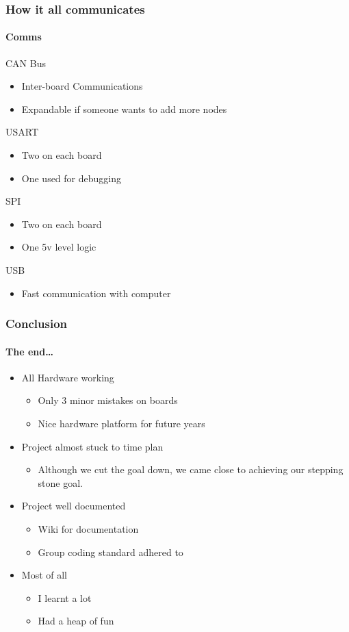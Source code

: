 \documentclass{beamer}
\begin{document}
\begin{frame}
\frametitle{How it all communicates}
\framesubtitle{Comms}
CAN Bus
\begin{itemize}
\item Inter-board Communications
\item Expandable if someone wants to add more nodes
\end{itemize}
USART
\begin{itemize}
\item Two on each board
\item One used for debugging
\end{itemize}
SPI
\begin{itemize}
\item Two on each board
\item One 5v level logic
\end{itemize}
USB
\begin{itemize}
\item Fast communication with computer
\end{itemize}
\end{frame}

\begin{frame}
\frametitle{Conclusion}
\framesubtitle{The end\ldots}
\begin{itemize}
\item All Hardware working
  \begin{itemize}
  \item Only 3 minor mistakes on boards
  \item Nice hardware platform for future years
  \end{itemize}
\item Project almost stuck to time plan
  \begin{itemize}
  \item Although we cut the goal down, we came close to achieving our stepping
  stone goal.
  \end{itemize}
\item Project well documented
  \begin{itemize}
  \item Wiki for documentation
  \item Group coding standard adhered to
  \end{itemize}
\item Most of all
  \begin{itemize}
  \item I learnt a lot
  \item Had a heap of fun
  \end{itemize}
\end{itemize}
\end{frame}
\end{document}
